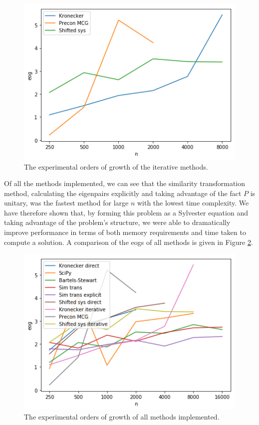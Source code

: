 \documentclass[11pt]{article}
\numberwithin{equation}{section}
\begin{document}
\begin{figure}[H]
\centering
\includegraphics[scale=.6]{img/iterative.png}
\caption{The experimental orders of growth of the iterative methods.}
\label{fig:iterative}
\end{figure}

Of all the methods implemented, we can see that the similarity transformation method, calculating the eigenpairs explicitly and taking advantage of the fact $P$ is unitary, was the fastest method for large $n$ with the lowest time complexity. We have therefore shown that, by forming this problem as a Sylvester equation and taking advantage of the problem's structure, we were able to dramatically improve performance in terms of both memory requirements and time taken to compute a solution. A comparison of the eogs of all methods is given in Figure \ref{fig:methods}.

\begin{figure}[H]
\centering
\includegraphics[scale=.6]{img/methods.png}
\caption{The experimental orders of growth of all methods implemented.}
\label{fig:methods}
\end{figure}
\end{document}
